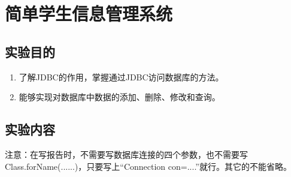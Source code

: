 ﻿\documentclass[cs5size,b5paper,nofonts,twoside]{ctexart}
\begin{document}
\clearpage
\section{简单学生信息管理系统}
\subsection{实验目的}
\begin{enumerate}
\item 了解JDBC的作用，掌握通过JDBC访问数据库的方法。
\item 能够实现对数据库中数据的添加、删除、修改和查询。
\end{enumerate}
\subsection{实验内容}
注意：在写报告时，不需要写数据库连接的四个参数，也不需要写Class.forName(......)，只要写上“Connection con=....”就行。其它的不能省略。
\end{document}
